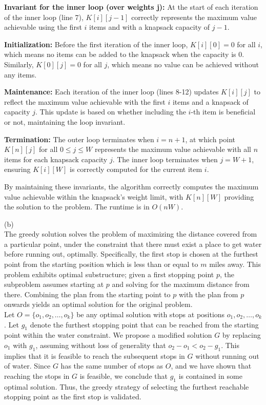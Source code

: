\documentclass{article}
\begin{document}
\textbf{Invariant for the inner loop (over weights j):} At the start of each iteration of the inner loop (line 7), $K[i][j-1]$ correctly represents the maximum value achievable using the first $i$ items and with a knapsack capacity of $j-1$.

\textbf{Initialization:} Before the first iteration of the inner loop, $K[i][0] = 0$ for all $i$, which means no items can be added to the knapsack when the capacity is $0$. Similarly, $K[0][j] = 0$ for all $j$, which means no value can be achieved without any items.

\textbf{Maintenance:} Each iteration of the inner loop (lines 8-12) updates $K[i][j]$ to reflect the maximum value achievable with the first $i$ items and a knapsack of capacity $j$. This update is based on whether including the $i$-th item is beneficial or not, maintaining the loop invariant.

\textbf{Termination:} The outer loop terminates when $i = n+1$, at which point $K[n][j]$ for all $0 \leq j \leq W$ represents the maximum value achievable with all $n$ items for each knapsack capacity $j$. The inner loop terminates when $j = W+1$, ensuring $K[i][W]$ is correctly computed for the current item $i$.

By maintaining these invariants, the algorithm correctly computes the maximum value achievable within the knapsack's weight limit, with $K[n][W]$ providing the solution to the problem. The runtime is in $O(nW)$.

(b)\\
The greedy solution solves the problem of maximizing the distance covered from a particular point, under the constraint that there must exist a place to get water before running out, optimally. Specifically, the first stop is chosen at the furthest point from the starting position which is less than or equal to $m$ miles away. This problem exhibits optimal substructure; given a first stopping point $p$, the subproblem assumes starting at $p$ and solving for the maximum distance from there. Combining the plan from the starting point to $p$ with the plan from $p$ onwards yields an optimal solution for the original problem.\\



Let $O = \{o_1, o_2, \dots, o_k\}$ be any optimal solution with stops at positions $o_1, o_2, \dots, o_k$. Let $g_1$ denote the furthest stopping point that can be reached from the starting point within the water constraint. We propose a modified solution $G$ by replacing $o_1$ with $g_1$, assuming without loss of generality that $o_2 - o_1 < o_2 - g_1$. This implies that it is feasible to reach the subsequent stops in $G$ without running out of water. Since $G$ has the same number of stops as $O$, and we have shown that reaching the stops in $G$ is feasible, we conclude that $g_1$ is contained in some optimal solution. Thus, the greedy strategy of selecting the furthest reachable stopping point as the first stop is validated.
\end{document}
